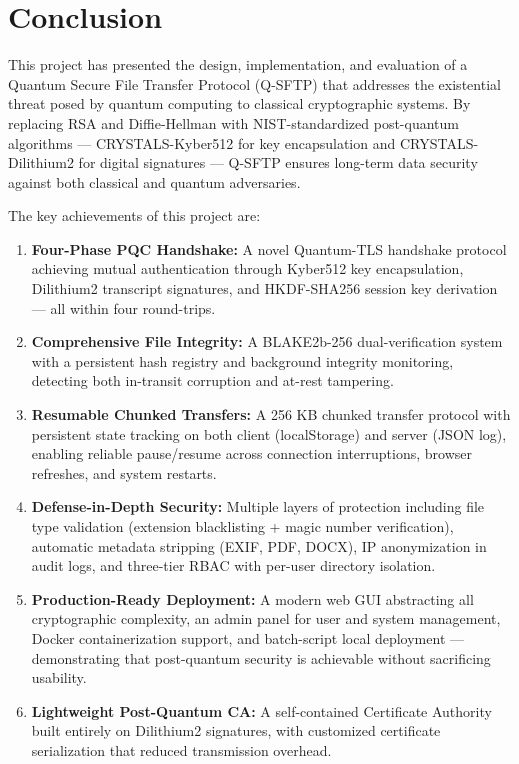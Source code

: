 \chapter{Conclusion}
\label{chap.7}

This project has presented the design, implementation, and evaluation of a Quantum Secure File Transfer Protocol (Q-SFTP) that addresses the existential threat posed by quantum computing to classical cryptographic systems. By replacing RSA and Diffie-Hellman with NIST-standardized post-quantum algorithms — CRYSTALS-Kyber512 for key encapsulation and CRYSTALS-Dilithium2 for digital signatures — Q-SFTP ensures long-term data security against both classical and quantum adversaries.

The key achievements of this project are:

\begin{enumerate}
    \item \textbf{Four-Phase PQC Handshake:} A novel Quantum-TLS handshake protocol achieving mutual authentication through Kyber512 key encapsulation, Dilithium2 transcript signatures, and HKDF-SHA256 session key derivation — all within four round-trips.
    
    \item \textbf{Comprehensive File Integrity:} A BLAKE2b-256 dual-verification system with a persistent hash registry and background integrity monitoring, detecting both in-transit corruption and at-rest tampering.
    
    \item \textbf{Resumable Chunked Transfers:} A 256 KB chunked transfer protocol with persistent state tracking on both client (localStorage) and server (JSON log), enabling reliable pause/resume across connection interruptions, browser refreshes, and system restarts.
    
    \item \textbf{Defense-in-Depth Security:} Multiple layers of protection including file type validation (extension blacklisting + magic number verification), automatic metadata stripping (EXIF, PDF, DOCX), IP anonymization in audit logs, and three-tier RBAC with per-user directory isolation.
    
    \item \textbf{Production-Ready Deployment:} A modern web GUI abstracting all cryptographic complexity, an admin panel for user and system management, Docker containerization support, and batch-script local deployment — demonstrating that post-quantum security is achievable without sacrificing usability.
    
    \item \textbf{Lightweight Post-Quantum CA:} A self-contained Certificate Authority built entirely on Dilithium2 signatures, with customized certificate serialization that reduced transmission overhead.
\end{enumerate}

